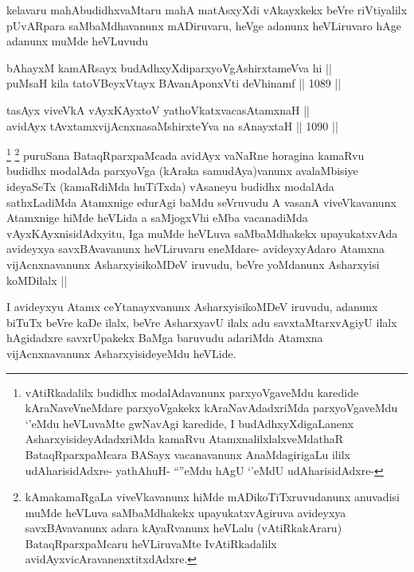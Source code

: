 \begin{artha}
kelavaru mahAbudidhxvaMtaru mahA matAsxyXdi vAkayxkekx beVre riVtiyalilx pUvARpara saMbaMdhavanunx mADiruvaru, heVge adanunx heVLiruvaro hAge adanunx muMde heVLuvudu
\end{artha}

\begin{shl}
bAhayxM kamARsayx budAdhxyXdiparxyoVgAshirxtameVva hi || \\
puMsaH kila tatoV\s BeyxVtayx BAvanA\s \s ponxVti deVhinamf ||  1089 ||  
\end{shl}
				
\begin{shl}
tasAyx viveVkA vAyxKAyxtoV yathoVkatxvacasA\s \s tamxnaH || \\
avidAyx tAvxtamxvijAcnxnasaMshirxteYva na sA\s nayxtaH ||  1090 ||  
\end{shl}

\begin{artha}
\footnote{vAtiRkadalilx budidhx modalAdavanunx parxyoVgaveMdu karedide kAraNaveVneMdare parxyoVgakekx kAraNavAdadxriMda parxyoVgaveMdu `\stext'eMdu heVLuvaMte gwNavAgi karedide, I budAdhxyXdigaLanenx AsharxyisideyAdadxriMda kamaRvu AtamxnalilxlalxveMdathaR BataqRparxpaMcara BASayx vacanavanunx AnaMdagirigaLu ililx udAharisidAdxre- yathAhuH- ``\stext''eMdu hAgU `\stext'eMdU udAharisidAdxre-}
\footnote{kAmakamaRgaLa viveVkavanunx hiMde mADikoTiTxruvudanunx anuvadisi muMde heVLuva saMbaMdhakekx upayukatxvAgiruva avideyxya savxBAvavanunx adara kAyaRvanunx heVLalu (vAtiRkakAraru) BataqRparxpaMcaru heVLiruvaMte IvAtiRkadalilx avidAyxvicAravanenxtitxdAdxre.}
puruSana BataqRparxpaMcada avidAyx vaNaRne horagina kamaRvu budidhx modalAda parxyoVga (kAraka samudAya)vanunx avalaMbisiye ideyaSeTx (kamaRdiMda huTiTxda) vAsaneyu budidhx modalAda sathxLadiMda Atamxnige edurAgi baMdu seVruvudu A vasanA viveVkavanunx Atamxnige hiMde heVLida a saMjogxVhi eMba vacanadiMda vAyxKAyxnisidAdxyitu, Iga muMde heVLuva saMbaMdhakekx upayukatxvAda avideyxya savxBAvavanunx heVLiruvaru eneMdare- avideyxyAdaro Atamxna vijAcnxnavanunx AsharxyisikoMDeV iruvudu, beVre yoMdanunx Asharxyisi koMDilalx ||
\end{artha}

\begin{artha}
I avideyxyu Atamx ceYtanayxvanunx AsharxyisikoMDeV iruvudu, adanunx biTuTx beVre kaDe ilalx, beVre AsharxyavU ilalx adu savxtaMtarxvAgiyU ilalx hAgidadxre savxrUpakekx BaMga baruvudu adariMda Atamxna vijAcnxnavanunx AsharxyisideyeMdu heVLide.
\end{artha}

